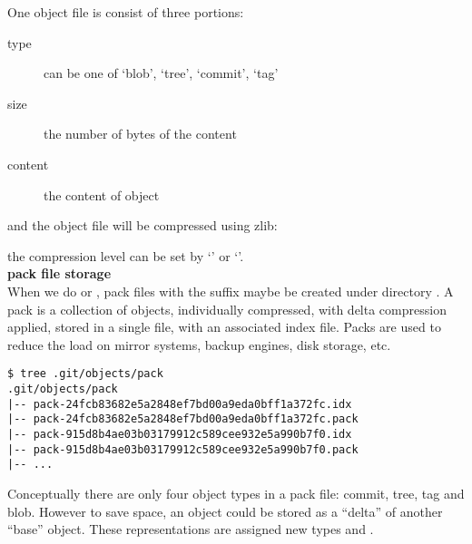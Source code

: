 One object file is consist of three portions:
\begin{description}
  \item[type] can be one of `blob', `tree', `commit', `tag'
  \item[size] the number of bytes of the content
  \item[content] the content of object
\end{description}

and the object file will be compressed using zlib:


the compression level can be set by `\textbf{}' or `\textbf{}'.
\\

\textbullet\textbf{\large{ pack file storage}}\\

When we do \emph{} or \emph{}, pack files with the suffix 
maybe be created under directory \emph{}.
A pack is a collection of objects,
individually compressed, with delta compression applied, stored in a single file, with an associated
index file.
Packs are used to reduce the load on mirror systems, backup engines, disk storage, etc.

\begin{lstlisting}[basicstyle=\ttfamily]
$ tree .git/objects/pack
.git/objects/pack
|-- pack-24fcb83682e5a2848ef7bd00a9eda0bff1a372fc.idx
|-- pack-24fcb83682e5a2848ef7bd00a9eda0bff1a372fc.pack
|-- pack-915d8b4ae03b03179912c589cee932e5a990b7f0.idx
|-- pack-915d8b4ae03b03179912c589cee932e5a990b7f0.pack
|-- ...
\end{lstlisting}

Conceptually there are only four object types in a pack file: commit, tree, tag and blob.
However to save space, an object could be stored as a ``delta'' of another ``base'' object.
These representations are assigned new types  and .

